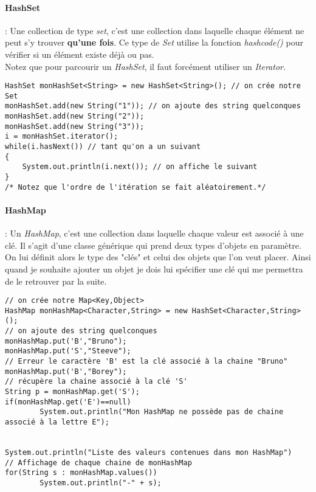 \documentclass{article}
\begin{document}
\paragraph{HashSet} : Une collection de type \emph{set}, c'est une collection dans laquelle chaque élément ne peut s'y trouver \textbf{qu'une fois}. Ce type de \emph{Set} utilise la fonction \emph{hashcode()} pour vérifier si un élément existe déjà ou pas.\\
Notez que pour parcourir un \emph{HashSet}, il faut forcément utiliser un \emph{Iterator}.
\begin{lstlisting}
HashSet monHashSet<String> = new HashSet<String>(); // on crée notre Set
monHashSet.add(new String("1")); // on ajoute des string quelconques
monHashSet.add(new String("2"));
monHashSet.add(new String("3"));
i = monHashSet.iterator();
while(i.hasNext()) // tant qu'on a un suivant
{
	System.out.println(i.next()); // on affiche le suivant
}
/* Notez que l'ordre de l'itération se fait aléatoirement.*/	
\end{lstlisting}

\paragraph{HashMap} : Un \emph{HashMap}, c'est une collection dans laquelle chaque valeur est associé à une clé. Il s'agit d'une classe générique qui prend deux types d'objets en paramètre. On lui définit alors le type des "clés" et celui des objets que l'on veut placer. Ainsi quand je souhaite ajouter un objet je dois lui spécifier une clé qui me permettra de le retrouver par la suite.
 
\begin{lstlisting}
// on crée notre Map<Key,Object>
HashMap monHashMap<Character,String> = new HashSet<Character,String>(); 
// on ajoute des string quelconques
monHashMap.put('B',"Bruno"); 
monHashMap.put('S',"Steeve");
// Erreur le caractère 'B' est la clé associé à la chaine "Bruno"
monHashMap.put('B',"Borey");
// récupère la chaine associé à la clé 'S'
String p = monHashMap.get('S'); 
if(monHashMap.get('E')==null)
        System.out.println("Mon HashMap ne possède pas de chaine associé à la lettre E");
 
 
System.out.println("Liste des valeurs contenues dans mon HashMap")
// Affichage de chaque chaine de monHashMap
for(String s : monHashMap.values())
        System.out.println("-" + s); 
 
\end{lstlisting}
\end{document}
